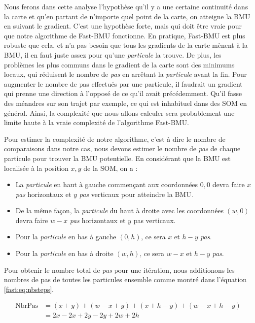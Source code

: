 	Nous ferons dans cette analyse l'hypothèse qu'il y a une certaine continuité dans la carte et qu'en partant de n'importe quel point de la carte, on atteigne la BMU en suivant le gradient. C'est une hypothèse forte, mais qui doit être vraie pour que notre algorithme de Fast-BMU fonctionne. En pratique, Fast-BMU est plus robuste que cela, et n'a pas besoin que tous les gradients de la carte mènent à la BMU, il en faut juste assez pour qu'une \textit{particule} la trouve. De plus, les problèmes les plus communs dans le gradient de la carte sont des minimums locaux, qui réduisent le nombre de \textit{pas} en arrêtant la \textit{particule} avant la fin. Pour augmenter le nombre de pas effectués par une particule, il faudrait un gradient qui prenne une direction à l'opposé de ce qu'il avait précédemment. Qu'il fasse des méandres sur son trajet par exemple, ce qui est inhabituel dans des SOM en général. Ainsi, la complexité que nous allons calculer sera probablement une limite haute à la vraie complexité de l'algorithme Fast-BMU. 

	Pour estimer la complexité de notre algorithme, c'est à dire le nombre de comparaisons dans notre cas, nous devons estimer le nombre de \textit{pas} de chaque particule pour trouver la BMU potentielle. En considérant que la BMU est localisée à la position $x, y$ de la SOM, on a :
	\begin{itemize}
    	\item La \textit{particule} en haut à gauche commençant aux coordonnées $0, 0$ devra faire $x$ \textit{pas} horizontaux et $y$ \textit{pas} verticaux pour atteindre la BMU.
		\item De la même façon, la \textit{particule} du haut à droite avec les coordonnées $(w,0)$ devra faire $w-x$ \textit{pas} horizontaux et $y$ pas verticaux.
		\item Pour la \textit{particule} en bas à gauche $(0,h)$, ce sera $x$ et $h-y$ \textit{pas}.
		\item Pour la \textit{particule} en bas à droite $(w,h)$, ce sera $w-x$ et $h-y$ \textit{pas}.
	\end{itemize}

	Pour obtenir le nombre total de \textit{pas} pour une itération, nous additionons les nombres de pas de toutes les particules ensemble comme montré dans l'équation \ref{fast:eq:nbsteps}.

	\begin{equation}\label{fast:eq:nbsteps}
	\begin{split}
    	\text{NbrPas} &= (x + y) + (w - x + y) + (x + h - y) + (w - x + h - y)\\
		&= 2x - 2x + 2y - 2y + 2w + 2h 
	\end{split}
	\end{equation}

